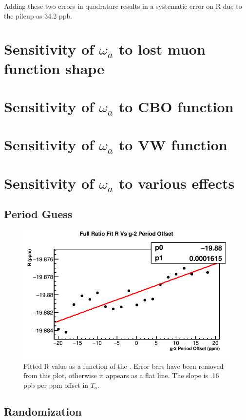 Adding these two errors in quadrature results in a systematic error on R due to the pileup as 34.2 ppb.



\section{Sensitivity of \texorpdfstring{$\omega_{a}$}{} to lost muon function shape}

\section{Sensitivity of \texorpdfstring{$\omega_{a}$}{} to CBO function}

\section{Sensitivity of \texorpdfstring{$\omega_{a}$}{} to VW function}

\section{Sensitivity of \texorpdfstring{$\omega_{a}$}{} to various effects}

\subsection{\gmtwo Period Guess}

\begin{figure}[H]
	\centering
	\includegraphics[width=.6\textwidth]{RatioCBO_R_Vs_gm2PeriodGuess_Canv}
    \caption[gm2PeriodGuess]{Fitted R value as a function of the .   Error bars have been removed from this plot, otherwise it appears as a flat line. The slope is .16 ppb per ppm offset in $T_{a}$.}
    \label{fig:gm2PeriodGuess}
\end{figure}


\subsection{Randomization}

